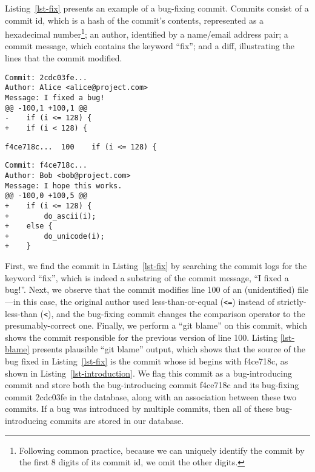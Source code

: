 Listing~\ref{lst-fix} presents an example of a bug-fixing commit. Commits
consist of a commit id, which is a hash of the commit's contents, represented as
a hexadecimal number\footnote{Following common practice, because we can uniquely
  identify the commit by the first 8 digits of its commit id, we omit the other
  digits.}; an author, identified by a name/email address pair; a commit
message, which contains the keyword ``fix''; and a diff, illustrating the lines
that the commit modified.


\begin{lstlisting}[caption=An example bug-fixing commit, label=lst-fix,
                   frame=single, captionpos=b, basicstyle=\small]
Commit: 2cdc03fe...
Author: Alice <alice@project.com>
Message: I fixed a bug!
@@ -100,1 +100,1 @@
-    if (i <= 128) {
+    if (i < 128) {
\end{lstlisting}

\begin{lstlisting}[caption={\tt git blame} output for the bug-fixing commit,
                   label=lst-blame, frame=single, captionpos=b, basicstyle=\small]
f4ce718c...  100    if (i <= 128) {
\end{lstlisting}

\begin{lstlisting}[caption=Associated bug-introducing commit for the example,
                   label=lst-introduction, frame=single, captionpos=b, basicstyle=\small]
Commit: f4ce718c...
Author: Bob <bob@project.com>
Message: I hope this works.
@@ -100,0 +100,5 @@
+    if (i <= 128) {
+        do_ascii(i);
+    else {
+        do_unicode(i);
+    }
\end{lstlisting}

First, we find the commit in Listing~\ref{lst-fix} by searching the commit
logs for the keyword ``fix'', which is indeed a substring of the commit message,
``I fixed a bug!''. Next, we observe that the commit modifies line 100 of
an (unidentified) file---in this case, the original author used
less-than-or-equal (\verb+<=+) instead of strictly-less-than (\verb+<+), and the
bug-fixing commit changes the comparison operator to the presumably-correct one.
Finally, we perform a ``git blame'' on this commit, which shows the commit
responsible for the previous version of line 100. Listing \ref{lst-blame}
presents plausible ``git blame'' output, which shows that the source of the bug
fixed in Listing~\ref{lst-fix} is the commit whose id begins with f4ce718c, as
shown in Listing~\ref{lst-introduction}. We flag this commit as a
bug-introducing commit and store both the bug-introducing commit f4ce718c and
its bug-fixing commit 2cdc03fe in the database, along with an association
between these two commits. If a bug was introduced by multiple commits, 
then all of these bug-introducing commits are stored in our database. 

